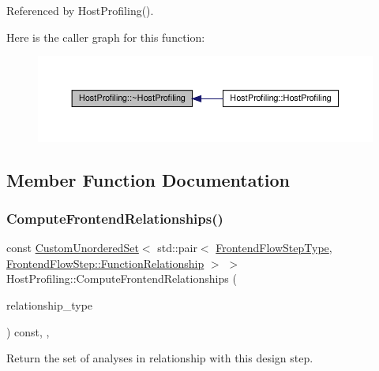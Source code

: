Referenced by Host\+Profiling().

Here is the caller graph for this function\+:
\nopagebreak
\begin{figure}[H]
\begin{center}
\leavevmode
\includegraphics[width=350pt]{d0/d3a/classHostProfiling_a04be7f9aeec2597dcb633d2728401c30_icgraph}
\end{center}
\end{figure}


\subsection{Member Function Documentation}
\mbox{\label{classHostProfiling_a79248ec2de929f59b88137e34837b869}} 
\subsubsection{\texorpdfstring{Compute\+Frontend\+Relationships()}{ComputeFrontendRelationships()}}
{\footnotesize\ttfamily const \hyperlink{classCustomUnorderedSet}{Custom\+Unordered\+Set}$<$ std\+::pair$<$ \hyperlink{frontend__flow__step_8hpp_afeb3716c693d2b2e4ed3e6d04c3b63bb}{Frontend\+Flow\+Step\+Type}, \hyperlink{classFrontendFlowStep_af7cf30f2023e5b99e637dc2058289ab0}{Frontend\+Flow\+Step\+::\+Function\+Relationship} $>$ $>$ Host\+Profiling\+::\+Compute\+Frontend\+Relationships (\begin{DoxyParamCaption}\item[{const \hyperlink{classDesignFlowStep_a723a3baf19ff2ceb77bc13e099d0b1b7}{Design\+Flow\+Step\+::\+Relationship\+Type}}]{relationship\+\_\+type }\end{DoxyParamCaption}) const\hspace{0.3cm}{\ttfamily [override]}, {\ttfamily [private]}, {\ttfamily [virtual]}}



Return the set of analyses in relationship with this design step. 


